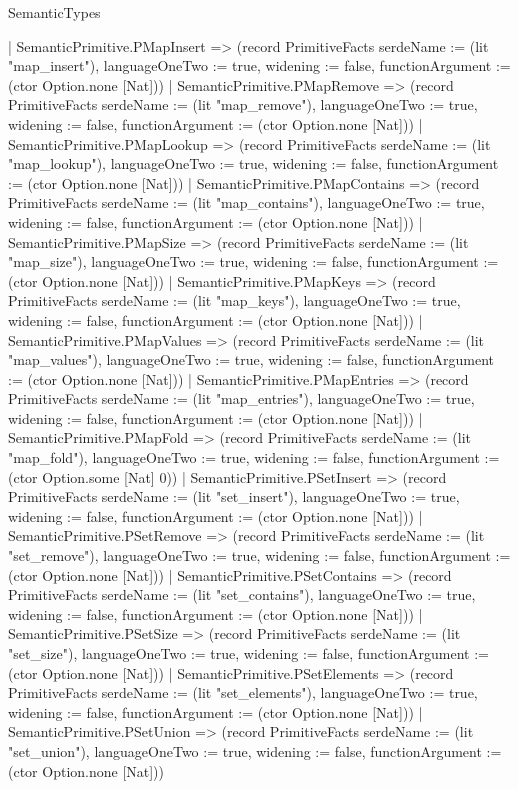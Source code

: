 \begin{lexlean}{SemanticTypes}
\begin{semanticmodule}
{    | SemanticPrimitive.PMapInsert => (record PrimitiveFacts {serdeName := (lit "map_insert"), languageOneTwo := true, widening := false, functionArgument := (ctor Option.none [Nat])})
    | SemanticPrimitive.PMapRemove => (record PrimitiveFacts {serdeName := (lit "map_remove"), languageOneTwo := true, widening := false, functionArgument := (ctor Option.none [Nat])})
    | SemanticPrimitive.PMapLookup => (record PrimitiveFacts {serdeName := (lit "map_lookup"), languageOneTwo := true, widening := false, functionArgument := (ctor Option.none [Nat])})
    | SemanticPrimitive.PMapContains => (record PrimitiveFacts {serdeName := (lit "map_contains"), languageOneTwo := true, widening := false, functionArgument := (ctor Option.none [Nat])})
    | SemanticPrimitive.PMapSize => (record PrimitiveFacts {serdeName := (lit "map_size"), languageOneTwo := true, widening := false, functionArgument := (ctor Option.none [Nat])})
    | SemanticPrimitive.PMapKeys => (record PrimitiveFacts {serdeName := (lit "map_keys"), languageOneTwo := true, widening := false, functionArgument := (ctor Option.none [Nat])})
    | SemanticPrimitive.PMapValues => (record PrimitiveFacts {serdeName := (lit "map_values"), languageOneTwo := true, widening := false, functionArgument := (ctor Option.none [Nat])})
    | SemanticPrimitive.PMapEntries => (record PrimitiveFacts {serdeName := (lit "map_entries"), languageOneTwo := true, widening := false, functionArgument := (ctor Option.none [Nat])})
    | SemanticPrimitive.PMapFold => (record PrimitiveFacts {serdeName := (lit "map_fold"), languageOneTwo := true, widening := false, functionArgument := (ctor Option.some [Nat] 0)})
    | SemanticPrimitive.PSetInsert => (record PrimitiveFacts {serdeName := (lit "set_insert"), languageOneTwo := true, widening := false, functionArgument := (ctor Option.none [Nat])})
    | SemanticPrimitive.PSetRemove => (record PrimitiveFacts {serdeName := (lit "set_remove"), languageOneTwo := true, widening := false, functionArgument := (ctor Option.none [Nat])})
    | SemanticPrimitive.PSetContains => (record PrimitiveFacts {serdeName := (lit "set_contains"), languageOneTwo := true, widening := false, functionArgument := (ctor Option.none [Nat])})
    | SemanticPrimitive.PSetSize => (record PrimitiveFacts {serdeName := (lit "set_size"), languageOneTwo := true, widening := false, functionArgument := (ctor Option.none [Nat])})
    | SemanticPrimitive.PSetElements => (record PrimitiveFacts {serdeName := (lit "set_elements"), languageOneTwo := true, widening := false, functionArgument := (ctor Option.none [Nat])})
    | SemanticPrimitive.PSetUnion => (record PrimitiveFacts {serdeName := (lit "set_union"), languageOneTwo := true, widening := false, functionArgument := (ctor Option.none [Nat])})
}
\end{semanticmodule}
\end{lexlean}
